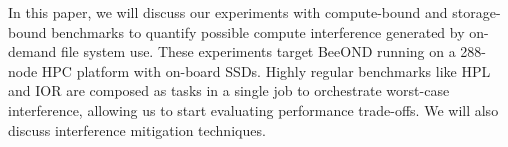 In this paper, we will discuss our experiments with compute-bound and storage-bound benchmarks to quantify possible compute interference generated by on-demand file system use. These experiments target BeeOND running on a 288-node HPC platform with on-board SSDs. Highly regular benchmarks like HPL and IOR are composed as tasks in a single job to orchestrate worst-case interference, allowing us to start evaluating performance trade-offs. We will also discuss interference mitigation techniques.
